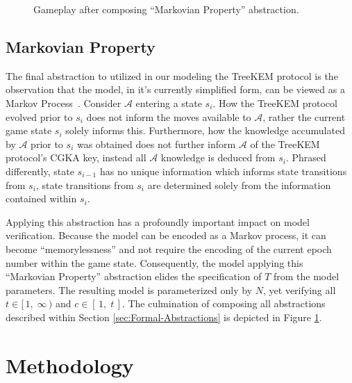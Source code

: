 \documentclass[runningheads]{llncs}
\newcommand{\Adversary}{\ensuremath{\mathcal{A}}\xspace}
\newcommand{\NumericRange}[2]{\ensuremath{\left[\,#1,\; #2\,\right]}\xspace}
\newcommand{\NumericRangeOpenR}[2]{\ensuremath{[\,#1,\; #2\,)}\xspace}
\begin{document}
\begin{figure}
\centering
{}
\caption[Transition graph of informal CGKA definition]{%
\label{fig:CGKA-Progressing}%
Gameplay after composing ``Required Progression'' abstraction.%
}%
\vfill
{}
\caption[Transition graph of informal CGKA definition]{%
\label{fig:CGKA-Markovian}%
Gameplay after composing ``Markovian Property'' abstraction.%
}%
\end{figure}


\subsection{Markovian Property}

The final abstraction to utilized in our modeling the TreeKEM protocol is the observation that the model, in it's currently simplified form, can be viewed as a Markov Process~\cite{markov1906a}.
Consider \Adversary entering a \CGKAsec state $s_{i}$.
How the TreeKEM protocol evolved prior to $s_{i}$ does not inform the moves available to \Adversary, rather the current game state $s_{i}$ solely informs this.
Furthermore, how the knowledge accumulated by \Adversary prior to $s_{i}$ was obtained does not further inform \Adversary of the TreeKEM protocol's CGKA key, instead all \Adversary knowledge is deduced from $s_{i}$.
Phrased differently, state $s_{i-1}$ has no unique information which informs state transitions from $s_{i}$, state transitions from $s_{i}$ are determined solely from the information contained within $s_{i}$.

Applying this abstraction has a profoundly important impact on model verification.
Because the model can be encoded as a Markov process, it can become ``memorylessness'' and not require the encoding of the current epoch number within the game state.
Consequently, the model applying this ``Markovian Property'' abstraction elides the specification of $T$ from the model parameters.
The resulting model is parameterized only by $N$, yet verifying all $t \in \NumericRangeOpenR{1}{\infty}$ and $c \in \NumericRange{1}{t}$.
The culmination of composing all abstractions described within Section \ref{sec:Formal-Abstractions} is depicted in Figure \ref{fig:CGKA-Markovian}.


\section{Methodology}
\end{document}
